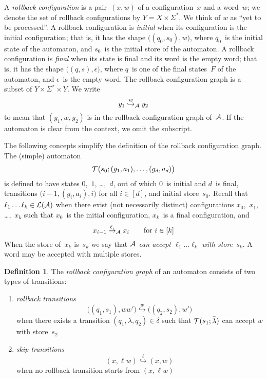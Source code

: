 \documentclass[9pt, preprint]{sigplanconf} %
\theoremstyle{definition}
\newtheorem{definition}{Definition}
\theoremstyle{remark}
\begin{document}
A \emph{rollback configuration} is a pair~$(x,w)$ of a configuration~$x$ and a word~$w$;
we denote the set of rollback configurations by $Y=X\times\Sigma^*$.
We think of $w$ as ``yet to be processed''.
A rollback configuration is \emph{initial} when its configuration is the initial configuration; that is, it has the shape $\bigl((q_0,s_0),w\bigr)$, where $q_0$~is the initial state of the automaton, and $s_0$~is the initial store of the automaton.
A rollback configuration is \emph{final} when its state is final and its word is the empty word; that is, it has the shape $\bigl((q,s),\epsilon\bigr)$, where $q$~is one of the final states~$F$ of the automaton, and $\epsilon$~is the empty word.
The rollback configuration graph is a subset of $Y\times\Sigma^*\times Y$.
We write \[ y_1 \stackrel w\hookrightarrow_{\cal A} y_2\] to mean that $(y_1,w,y_2)$ is in the rollback configuration graph of~${\cal A}$.
If the automaton is clear from the context, we omit the subscript.

The following concepts simplify the definition of the rollback configuration graph.
The (simple) automaton \[{\cal T}\bigl(s_0;(g_1,a_1),\ldots,(g_d,a_d)\bigr)\] is defined to have states $0$,~$1$, \dots,~$d$, out of which $0$~is initial and $d$~is final, transitions $\bigl(i-1,(g_i,a_i),i\bigr)$ for all $i\in[d]$, and initial store~$s_0$.
Recall that $\ell_1\ldots\ell_k\in{\cal L}({\cal A})$ when there exist (not necessarily distinct) configurations $x_0$,~$x_1$, \dots,~$x_k$ such that $x_0$~is the initial configuration, $x_k$~is a final configuration, and \[x_{i-1}\stackrel{\ell_i}\to_{\cal A}x_i\qquad\text{for $i\in[k]$}\]
When the store of~$x_k$ is~$s_k$ we say that \emph{${\cal A}$ can accept $\ell_1\ldots\ell_k$ with store~$s_k$}.
A word may be accepted with multiple stores.

\begin{definition}\label{def:rcg}
The \emph{rollback configuration graph} of an automaton consists of two types of transitions:
\begin{enumerate}
\item \emph{rollback transitions}
  \[\bigl((q_1,s_1),ww'\bigr)\stackrel w\hookrightarrow\bigl((q_2,s_2),w'\bigr)\]
when there exists a transition $(q_1,\bar\lambda,q_2)\in\delta$ such that ${\cal T}(s_1;\bar\lambda)$ can accept $w$ with store~$s_2$
\item \emph{skip transitions}
  \[(x,\ell w)\stackrel\ell\hookrightarrow(x,w)\]
when no rollback transition starts from $(x,\ell w)$
\end{enumerate}
\end{definition}
\end{document}
